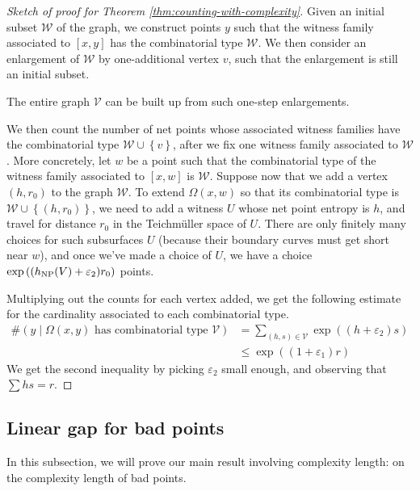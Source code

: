 \documentclass[12pt, reqno]{amsart}
\begin{document}
\begin{proof}[Sketch of proof for Theorem \ref{thm:counting-with-complexity}]
  Given an initial subset $\mathcal{W}$ of the graph, we construct points $y$ such that the witness family associated to $[x,y]$ has the combinatorial type $\mathcal{W}$.
  We then consider an enlargement of $\mathcal{W}$ by one-additional vertex $v$, such that the enlargement is still an initial subset.
  \begin{claim*}
    The entire graph $\mathcal{V}$ can be built up from such one-step enlargements.
  \end{claim*}

  We then count the number of net points whose associated witness families have the combinatorial type $\mathcal{W} \cup \left\{ v \right\}$, after we fix one witness family associated to $\mathcal{W}$.
  More concretely, let $w$ be a point such that the combinatorial type of the witness family associated to $[x,w]$ is $\mathcal{W}$.
  Suppose now that we add a vertex $(h, r_0)$ to the graph $\mathcal{W}$.
  To extend $\Omega(x,w)$ so that its combinatorial type is $\mathcal{W} \cup \left\{ (h, r_0) \right\}$, we need to add a witness $U$ whose net point entropy is $h$, and travel for distance $r_0$ in the Teichmüller space of $U$.
  There are only finitely many choices for such subsurfaces $U$ (because their boundary curves must get short near $w$), and once we've made a choice of $U$, we have a choice $\exp\left( (h_{\mathrm{NP}}(V) + \varepsilon_2) r_0 \right)$ points.

  Multiplying out the counts for each vertex added, we get the following estimate for the cardinality associated to each combinatorial type.
  \begin{align*}
    \#\left( y \mid \text{$\Omega(x,y)$ has combinatorial type $\mathcal{V}$} \right) &= \sum_{(h, s) \in \mathcal{V}} \exp\left( (h + \varepsilon_2)s \right) \\
    &\leq \exp\left( (1 + \varepsilon_1)r \right)
  \end{align*}
  We get the second inequality by picking $\varepsilon_2$ small enough, and observing that $\sum hs = r$.
\end{proof}

\subsection{Linear gap for bad points}
\label{sec:linear-gap-bad}

In this subsection, we will prove our main result involving complexity length: on the complexity length of bad points.
\end{document}
